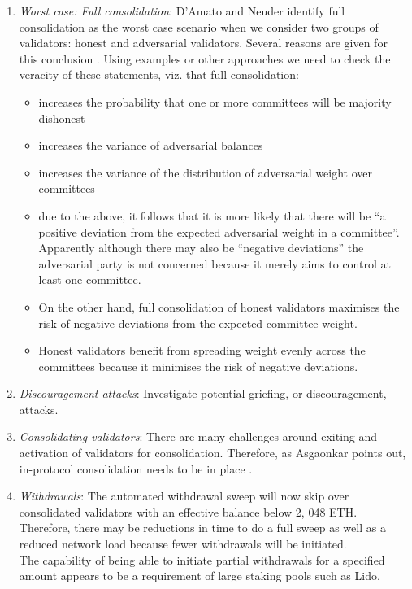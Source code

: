\documentclass[UTF8]{article}
\begin{document}
\begin{enumerate}

\item \textit{Worst case: Full consolidation}: D'Amato and Neuder identify full consolidation as the worst case scenario when we consider two groups of validators: honest and adversarial validators. Several reasons are given for this conclusion \cite{damato2023}. Using examples or other approaches we need to check the veracity of these statements, viz. that full consolidation:
	\begin{itemize}
	\item increases the probability that one or more committees will be majority dishonest
	\item increases the variance of adversarial balances
	\item increases the variance of the distribution of adversarial weight over committees
	\item due to the above, it follows that it is more likely that there will be ``a positive deviation from the expected adversarial weight in a committee''. Apparently although there may also be ``negative deviations'' the adversarial party is not concerned because it merely aims to control at least one committee.
	\item On the other hand, full consolidation of honest validators maximises the risk of negative deviations from the expected committee weight.
	\item Honest validators benefit from spreading weight evenly across the committees because it minimises the risk of negative deviations.
	\end{itemize}


\item \textit{Discouragement attacks}: Investigate potential griefing, or discouragement, attacks.

\item \textit{Consolidating validators}: There are many challenges around exiting and activation of validators for consolidation. Therefore, as Asgaonkar points out, in-protocol consolidation needs to be in place \cite{Asgaonkar2023}.

\item \textit{Withdrawals}: The automated withdrawal sweep will now skip over consolidated validators with an effective balance below 2, 048 ETH. Therefore, there may be reductions in time to do a full sweep as well as a reduced network load because fewer withdrawals will be initiated. \\
The capability of being able to initiate partial withdrawals for a specified amount appears to be a requirement of large staking pools such as Lido.


\end{enumerate}
\end{document}
